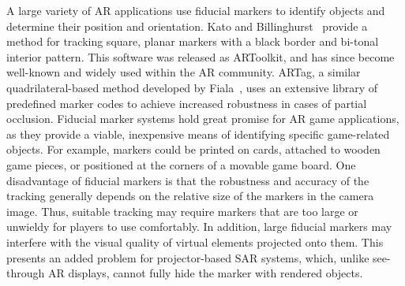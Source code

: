 \documentclass[review]{vgtc}                 %
\begin{document}
A large variety of AR applications use fiducial markers to identify
objects and determine their position and orientation.  Kato and
Billinghurst~\cite{Kato1999} provide a method for tracking square,
planar markers with a black border and bi-tonal interior pattern.
This software was released as ARToolkit, and has since become
well-known and widely used within the AR community.  ARTag, a similar
quadrilateral-based method developed by Fiala~\cite{Fiala2005}, uses
an extensive library of predefined marker codes to achieve increased
robustness in cases of partial occlusion. 
%
Fiducial marker systems hold great promise for AR game applications,
as they provide a viable, inexpensive means of identifying specific
game-related objects.  For example, markers could be printed on cards,
attached to wooden game pieces, or positioned at the corners of a
movable game board.
One disadvantage of fiducial markers is that the robustness and
accuracy of the tracking generally depends on the relative size of the
markers in the camera image.
Thus, suitable tracking may require markers that are too large or
unwieldy for players to use comfortably.  In addition, large fiducial
markers may interfere with the visual quality of virtual elements
projected onto them.  This presents an added problem for
projector-based SAR systems, which, unlike see-through AR displays,
cannot fully hide the marker with rendered objects.
\end{document}

